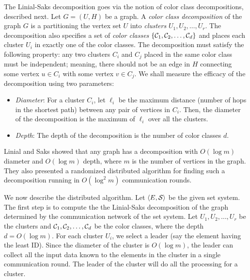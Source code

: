 \documentclass[11pt]{article}
\newcommand{\calC} {{\cal C}}
\newcommand{\calS} {{\cal S}}
\newcommand{\pair}[2] {\langle #1, #2\rangle}
\begin{document}
The Linial-Saks decomposition goes via the notion of color class decompositions, described next.
Let $G=(U,H)$ be a graph. A {\em color class decomposition}
of the graph $G$ is a partitioning the vertex set $U$ into {\em clusters}
$U_1, U_2, \ldots, U_r$.
The decomposition also specifies a set of {\em color classes}
$\{\calC_1, \calC_2, \ldots, \calC_d\}$
and places each cluster $U_i$ in exactly one of the color classes.
The decomposition must satisfy the following property:
any two clusters $C_i$ and $C_j$ placed in the same color class
must be independent; meaning, there should not be an edge in $H$
connecting some vertex $u\in C_i$ with some vertex $v\in C_j$.
We shall measure the efficacy of the decomposition using two parameters:
\begin{itemize}
\item
{\em Diameter}: For a cluster $C_i$, let $\ell_i$ be the maximum distance (number of hops in the
shortest path) between any pair of vertices in $C_i$. Then, the diameter of the decomposition
is the maximum of $\ell_i$ over all the clusters.
\item
{\em Depth}: The depth of the decomposition is the number of color classes $d$.
\end{itemize}

Linial and Saks \cite{LS} showed that any graph has
a decomposition with $O(\log m)$ diameter and $O(\log m)$ depth, where $m$ is the number of vertices in the graph.
They also presented a randomized distributed algorithm for finding such a decomposition
running in $O(\log^2 m)$ communication rounds.

We now describe the distributed algorithm. 
Let $\pair{E}{\calS}$ be the given set system.
The first step is to compute the the Linial-Saks decomposition of the graph determined by the communication network
of the set system.
Let $U_1, U_2, \ldots, U_r$ be the clusters and 
$\calC_1, \calC_2, \ldots, \calC_d$ be the color classes, where the depth $d=O(\log m)$.
For each cluster $U_i$, we select a leader (say the element having the least ID).
Since the diameter of the cluster is $O(\log m)$, the leader can collect all the input data
known to the elements in the cluster in a single communication round.
The leader of the cluster will do all the processing for a cluster.
\end{document}
